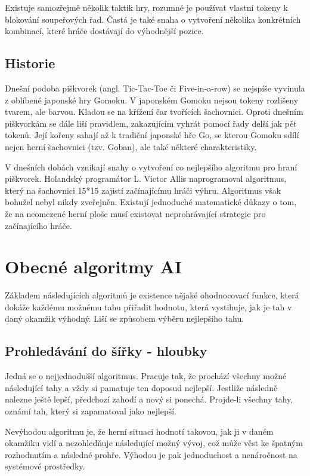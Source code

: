 \documentclass[a4paper,11pt,titlepage]{article}
\begin{document}
Existuje samozřejmě několik taktik hry, rozumné je používat vlastní tokeny k blokování soupeřových řad. Častá je také snaha o vytvoření několika konkrétních kombinací, které hráče dostávají do výhodnější pozice.

\subsection{Historie}
Dnešní podoba piškvorek (angl. Tic-Tac-Toe či Five-in-a-row) se nejspíše vyvinula z oblíbené japonské hry Gomoku. V japonském Gomoku nejsou tokeny rozlišeny tvarem, ale barvou. Kladou se na křížení čar tvořících šachovnici. Oproti dnešním piškvorkám se dále liší pravidlem, zakazujícím vyhrát pomocí řady delší jak pět tokenů. Její kořeny sahají až k tradiční japonské hře Go, se kterou Gomoku sdílí nejen herní šachovnici (tzv. Goban), ale také některé charakteristiky.

V dnešních dobách vznikají snahy o vytvoření co nejlepšího algoritmu pro hraní piškvorek. Holandský programátor L. Victor Allis naprogramoval algoritmus, který na šachovnici 15*15 zajistí začínajícímu hráči výhru. Algoritmus však bohužel nebyl nikdy zveřejněn. Existují jednoduché matematické důkazy o tom, že na neomezené herní ploše musí existovat neprohrávající strategie pro začínajícího hráče.
\newpage


\section{Obecné algoritmy AI}
Základem následujících algoritmů je existence nějaké ohodnocovací funkce, která dokáže každému možnému tahu přiřadit hodnotu, která vystihuje, jak je tah v daný okamžik výhodný. Liší se způsobem výběru nejlepšího tahu.

\subsection{Prohledávání do šířky - hloubky}
Jedná se o nejjednodušší algoritmus. Pracuje tak, že prochází všechny možné následující tahy a vždy si pamatuje ten doposud nejlepší. Jestliže nás\-led\-ně nalezne ještě lepší, předchozí zahodí a nový si ponechá. Projde-li všechny tahy, oznámí tah, který si zapamatoval jako nejlepší.

Nevýhodou algoritmu je, že herní situaci hodnotí takovou, jak ji v daném okamžiku vidí a nezohledňuje následující možný vývoj, což může věst ke špatným rozhodnutím a následné prohře. Výhodou je pak jednoduchost a nenáročnost na systémové prostředky.
\end{document}
